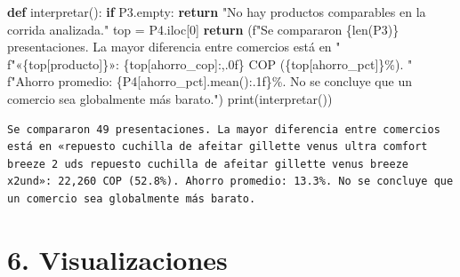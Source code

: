 \documentclass[
  spanish,
  letterpaper,
  DIV=11,
  numbers=noendperiod]{scrartcl}
\newenvironment{Shaded}{\begin{snugshade}}{\end{snugshade}}
\newcommand{\BuiltInTok}[1]{\textcolor[rgb]{0.00,0.23,0.31}{#1}}
\newcommand{\ControlFlowTok}[1]{\textcolor[rgb]{0.00,0.23,0.31}{\textbf{#1}}}
\newcommand{\DecValTok}[1]{\textcolor[rgb]{0.68,0.00,0.00}{#1}}
\newcommand{\KeywordTok}[1]{\textcolor[rgb]{0.00,0.23,0.31}{\textbf{#1}}}
\newcommand{\NormalTok}[1]{\textcolor[rgb]{0.00,0.23,0.31}{#1}}
\newcommand{\OperatorTok}[1]{\textcolor[rgb]{0.37,0.37,0.37}{#1}}
\newcommand{\SpecialCharTok}[1]{\textcolor[rgb]{0.37,0.37,0.37}{#1}}
\newcommand{\SpecialStringTok}[1]{\textcolor[rgb]{0.13,0.47,0.30}{#1}}
\newcommand{\StringTok}[1]{\textcolor[rgb]{0.13,0.47,0.30}{#1}}
\begin{document}
\begin{Shaded}
\begin{Highlighting}[]
\KeywordTok{def}\NormalTok{ interpretar():}
    \ControlFlowTok{if}\NormalTok{ P3.empty:}
        \ControlFlowTok{return} \StringTok{"No hay productos comparables en la corrida analizada."}
\NormalTok{    top }\OperatorTok{=}\NormalTok{ P4.iloc[}\DecValTok{0}\NormalTok{]}
    \ControlFlowTok{return}\NormalTok{ (}\SpecialStringTok{f"Se compararon }\SpecialCharTok{\{}\BuiltInTok{len}\NormalTok{(P3)}\SpecialCharTok{\}}\SpecialStringTok{ presentaciones. La mayor diferencia entre comercios está en "}
            \SpecialStringTok{f"«}\SpecialCharTok{\{}\NormalTok{top[}\StringTok{\textquotesingle{}producto\textquotesingle{}}\NormalTok{]}\SpecialCharTok{\}}\SpecialStringTok{»: }\SpecialCharTok{\{}\NormalTok{top[}\StringTok{\textquotesingle{}ahorro\_cop\textquotesingle{}}\NormalTok{]}\SpecialCharTok{:,.0f\}}\SpecialStringTok{ COP (}\SpecialCharTok{\{}\NormalTok{top[}\StringTok{\textquotesingle{}ahorro\_pct\textquotesingle{}}\NormalTok{]}\SpecialCharTok{\}}\SpecialStringTok{\%). "}
            \SpecialStringTok{f"Ahorro promedio: }\SpecialCharTok{\{}\NormalTok{P4[}\StringTok{\textquotesingle{}ahorro\_pct\textquotesingle{}}\NormalTok{]}\SpecialCharTok{.}\NormalTok{mean()}\SpecialCharTok{:.1f\}}\SpecialStringTok{\%. No se concluye que un comercio sea globalmente más barato."}\NormalTok{)}
\BuiltInTok{print}\NormalTok{(interpretar())}
\end{Highlighting}
\end{Shaded}

\begin{verbatim}
Se compararon 49 presentaciones. La mayor diferencia entre comercios está en «repuesto cuchilla de afeitar gillette venus ultra comfort breeze 2 uds repuesto cuchilla de afeitar gillette venus breeze x2und»: 22,260 COP (52.8%). Ahorro promedio: 13.3%. No se concluye que un comercio sea globalmente más barato.
\end{verbatim}

\section{6. Visualizaciones}\label{visualizaciones}
\end{document}
